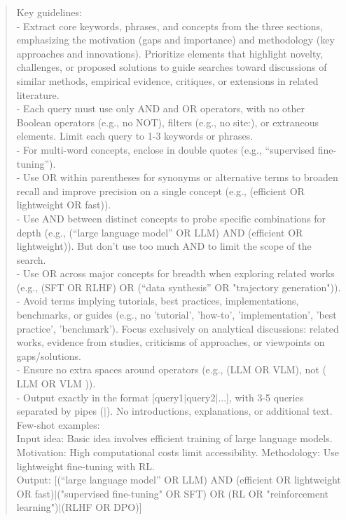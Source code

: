 \begin{quote}
\begin{tcolorbox}[breakable,colback=search!20!white, colframe=search!60!black, title=\textbf{Prompt for Search Agent (Query Generation - Web)}]
        Key guidelines:\\
        - Extract core keywords, phrases, and concepts from the three sections, emphasizing the motivation (gaps and importance) and methodology (key approaches and innovations). Prioritize elements that highlight novelty, challenges, or proposed solutions to guide searches toward discussions of similar methods, empirical evidence, critiques, or extensions in related literature.\\
        - Each query must use only AND and OR operators, with no other Boolean operators (e.g., no NOT), filters (e.g., no site:), or extraneous elements. Limit each query to 1-3 keywords or phrases.\\
        - For multi-word concepts, enclose in double quotes (e.g., ``supervised fine-tuning'').\\
        - Use OR within parentheses for synonyms or alternative terms to broaden recall and improve precision on a single concept (e.g., (efficient OR lightweight OR fast)).\\
        - Use AND between distinct concepts to probe specific combinations for depth (e.g., (``large language model'' OR LLM) AND (efficient OR lightweight)). But don't use too much AND to limit the scope of the search.\\
        - Use OR across major concepts for breadth when exploring related works (e.g., (SFT OR RLHF) OR (``data synthesis'' OR "trajectory generation")).\\
        - Avoid terms implying tutorials, best practices, implementations, benchmarks, or guides (e.g., no 'tutorial', 'how-to', 'implementation', 'best practice', 'benchmark'). Focus exclusively on analytical discussions: related works, evidence from studies, criticisms of approaches, or viewpoints on gaps/solutions.\\
        - Ensure no extra spaces around operators (e.g., (LLM OR VLM), not ( LLM OR VLM )).\\
        - Output exactly in the format [query1$\mid$query2$\mid$...], with 3-5 queries separated by pipes ($\mid$). No introductions, explanations, or additional text.\\

        Few-shot examples:\\
        Input idea: Basic idea involves efficient training of large language models. Motivation: High computational costs limit accessibility. Methodology: Use lightweight fine-tuning with RL.\\
        Output: [(``large language model'' OR LLM) AND (efficient OR lightweight OR fast)$\mid$("supervised fine-tuning" OR SFT) OR (RL OR "reinforcement learning")$\mid$(RLHF OR DPO)]\\


\end{tcolorbox}
\end{quote}
